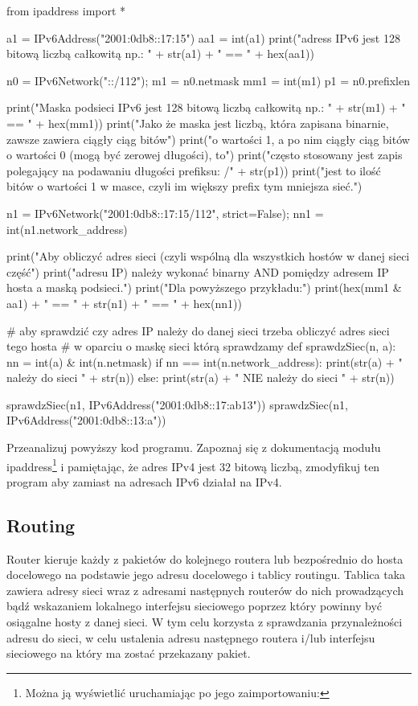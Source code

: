 \documentclass{pdfBooklets}
\begin{document}
\begin{CodeFrame*}[python][fontsize=\footnotesize]{}
from ipaddress import *

a1  = IPv6Address("2001:0db8::17:15")
aa1 = int(a1)
print("adress IPv6 jest 128 bitową liczbą całkowitą np.: " + str(a1) + " == " + hex(aa1))

n0  = IPv6Network("::/112");
m1  = n0.netmask
mm1 = int(m1)
p1  = n0.prefixlen

print("Maska podsieci IPv6 jest 128 bitową liczbą całkowitą np.: " + str(m1) + " == " + hex(mm1))
print("Jako że maska jest liczbą, która zapisana binarnie, zawsze zawiera ciągły ciąg bitów")
print("o wartości 1, a po nim ciągły ciąg bitów o wartości 0 (mogą być zerowej długości), to")
print("często stosowany jest zapis polegający na podawaniu długości prefiksu: /" + str(p1))
print("jest to ilość bitów o wartości 1 w masce, czyli im większy prefix tym mniejsza sieć.")

n1  = IPv6Network("2001:0db8::17:15/112", strict=False);
nn1 = int(n1.network_address)

print("Aby obliczyć adres sieci (czyli wspólną dla wszystkich hostów w danej sieci część")
print("adresu IP) należy wykonać binarny AND pomiędzy adresem IP hosta a maską podsieci.")
print("Dla powyższego przykładu:")
print(hex(mm1 & aa1) + " == " + str(n1) + " == " + hex(nn1))

# aby sprawdzić czy adres IP należy do danej sieci trzeba obliczyć adres sieci tego hosta
# w oparciu o maskę sieci którą sprawdzamy
def sprawdzSiec(n, a):
	nn = int(a) & int(n.netmask)
	if nn == int(n.network_address):
		print(str(a) + " należy do sieci " + str(n))
	else:
		print(str(a) + " NIE należy do sieci " + str(n))

sprawdzSiec(n1, IPv6Address("2001:0db8::17:ab13"))
sprawdzSiec(n1, IPv6Address("2001:0db8::13:a"))
\end{CodeFrame*}


\begin{Zadanie}{}{}
Przeanalizuj powyższy kod programu. Zapoznaj się z dokumentacją modułu ipaddress\footnote{Można ją wyświetlić uruchamiając po jego zaimportowaniu: } i pamiętając, że adres IPv4 jest 32 bitową liczbą, zmodyfikuj ten program aby zamiast na adresach IPv6 działał na IPv4.
\end{Zadanie}

\subsection{Routing}
Router kieruje każdy z pakietów do kolejnego routera lub bezpośrednio do hosta docelowego na podstawie jego adresu docelowego i tablicy routingu. Tablica taka zawiera adresy sieci wraz z adresami następnych routerów do nich prowadzących bądź wskazaniem lokalnego interfejsu sieciowego poprzez który powinny być osiągalne hosty z danej sieci. W tym celu korzysta z sprawdzania przynależności adresu do sieci, w celu ustalenia adresu następnego routera i/lub interfejsu sieciowego na który ma zostać przekazany pakiet.
\end{document}
